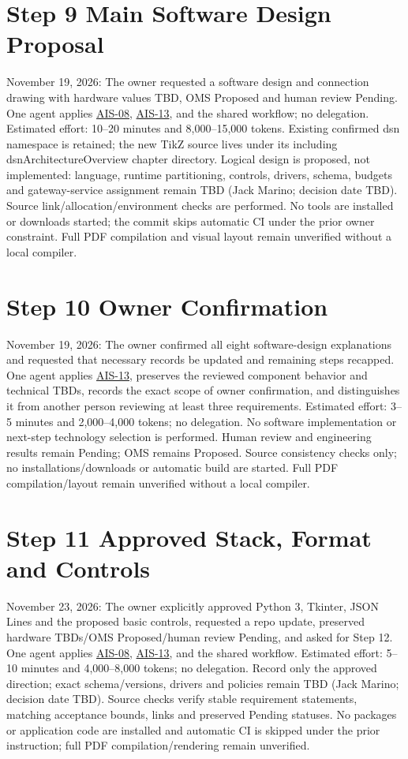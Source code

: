\section{Step 9 Main Software Design Proposal}
November 19, 2026: The owner requested a software design and connection drawing with hardware values TBD, OMS Proposed and human review Pending. One agent applies \hyperref[Skill:AIS-08]{AIS-08}, \hyperref[Skill:AIS-13]{AIS-13}, and the shared workflow; no delegation. Estimated effort: 10--20 minutes and 8,000--15,000 tokens. Existing confirmed dsn namespace is retained; the new TikZ source lives under its including dsnArchitectureOverview chapter directory. Logical design is proposed, not implemented: language, runtime partitioning, controls, drivers, schema, budgets and gateway-service assignment remain TBD (Jack Marino; decision date TBD). Source link/allocation/environment checks are performed. No tools are installed or downloads started; the commit skips automatic CI under the prior owner constraint. Full PDF compilation and visual layout remain unverified without a local compiler.
\section{Step 10 Owner Confirmation}
November 19, 2026: The owner confirmed all eight software-design explanations and requested that necessary records be updated and remaining steps recapped. One agent applies \hyperref[Skill:AIS-13]{AIS-13}, preserves the reviewed component behavior and technical TBDs, records the exact scope of owner confirmation, and distinguishes it from another person reviewing at least three requirements. Estimated effort: 3--5 minutes and 2,000--4,000 tokens; no delegation. No software implementation or next-step technology selection is performed. Human review and engineering results remain Pending; OMS remains Proposed. Source consistency checks only; no installations/downloads or automatic build are started. Full PDF compilation/layout remain unverified without a local compiler.
\section{Step 11 Approved Stack, Format and Controls}
November 23, 2026: The owner explicitly approved Python 3, Tkinter, JSON Lines and the proposed basic controls, requested a repo update, preserved hardware TBDs/OMS Proposed/human review Pending, and asked for Step 12. One agent applies \hyperref[Skill:AIS-08]{AIS-08}, \hyperref[Skill:AIS-13]{AIS-13}, and the shared workflow. Estimated effort: 5--10 minutes and 4,000--8,000 tokens; no delegation. Record only the approved direction; exact schema/versions, drivers and policies remain TBD (Jack Marino; decision date TBD). Source checks verify stable requirement statements, matching acceptance bounds, links and preserved Pending statuses. No packages or application code are installed and automatic CI is skipped under the prior instruction; full PDF compilation/rendering remain unverified.

